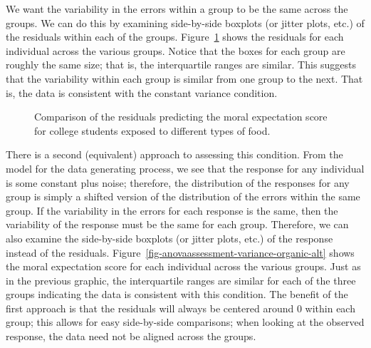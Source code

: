 \documentclass[
  letterpaper,
  DIV=11,
  numbers=noendperiod]{scrreprt}
\theoremstyle{definition}
\theoremstyle{definition}
\theoremstyle{plain}
\theoremstyle{remark}
\begin{document}
We want the variability in the errors within a group to be the same
across the groups. We can do this by examining side-by-side boxplots (or
jitter plots, etc.) of the residuals within each of the groups.
Figure~\ref{fig-anovaassessment-variance-organic} shows the residuals
for each individual across the various groups. Notice that the boxes for
each group are roughly the same size; that is, the interquartile ranges
are similar. This suggests that the variability within each group is
similar from one group to the next. That is, the data is consistent with
the constant variance condition.

\begin{figure}


\caption{\label{fig-anovaassessment-variance-organic}Comparison of the
residuals predicting the moral expectation score for college students
exposed to different types of food.}

\end{figure}%

There is a second (equivalent) approach to assessing this condition.
From the model for the data generating process, we see that the response
for any individual is some constant plus noise; therefore, the
distribution of the responses for any group is simply a shifted version
of the distribution of the errors within the same group. If the
variability in the errors for each response is the same, then the
variability of the response must be the same for each group. Therefore,
we can also examine the side-by-side boxplots (or jitter plots, etc.) of
the response instead of the residuals.
Figure~\ref{fig-anovaassessment-variance-organic-alt} shows the moral
expectation score for each individual across the various groups. Just as
in the previous graphic, the interquartile ranges are similar for each
of the three groups indicating the data is consistent with this
condition. The benefit of the first approach is that the residuals will
always be centered around 0 within each group; this allows for easy
side-by-side comparisons; when looking at the observed response, the
data need not be aligned across the groups.
\end{document}

